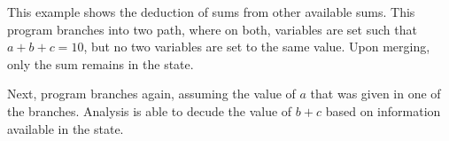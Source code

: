 This example shows the deduction of sums from other available sums. This
program branches into two path, where on both, variables are set such
that $a+b+c=10$, but no two variables are set to the same value. Upon
merging, only the sum remains in the state.

Next, program branches again, assuming the value of $a$ that was given
in one of the branches. Analysis is able to decude the value of $b+c$
based on information available in the state.
